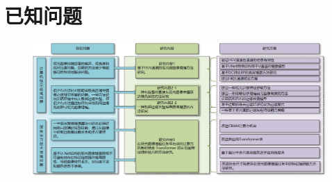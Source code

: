 \documentclass[CJK,aspectratio=169]{beamer}  %
\begin{document}
	\section{已知问题}
	\begin{frame}
		\begin{figure}
			\centering			
			\begin{minipage}{\columnwidth}
				\setlength{\abovecaptionskip}{-0.05cm}
				\centering
				\includegraphics[width=\textwidth]{picture/LLIE/My Architecture/Total}
			\end{minipage}
		\end{figure}
	\end{frame}
	
\end{document}
